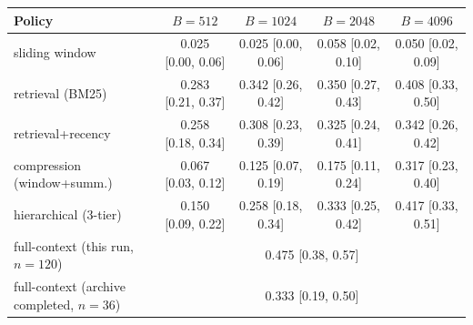 \begin{tabular}{lcccc}
\toprule
Policy & $B{=}512$ & $B{=}1024$ & $B{=}2048$ & $B{=}4096$ \\
\midrule
sliding window & 0.025 [0.00, 0.06] & 0.025 [0.00, 0.06] & 0.058 [0.02, 0.10] & 0.050 [0.02, 0.09] \\
retrieval (BM25) & 0.283 [0.21, 0.37] & 0.342 [0.26, 0.42] & 0.350 [0.27, 0.43] & 0.408 [0.33, 0.50] \\
retrieval+recency & 0.258 [0.18, 0.34] & 0.308 [0.23, 0.39] & 0.325 [0.24, 0.41] & 0.342 [0.26, 0.42] \\
compression (window+summ.) & 0.067 [0.03, 0.12] & 0.125 [0.07, 0.19] & 0.175 [0.11, 0.24] & 0.317 [0.23, 0.40] \\
hierarchical (3-tier) & 0.150 [0.09, 0.22] & 0.258 [0.18, 0.34] & 0.333 [0.25, 0.42] & 0.417 [0.33, 0.51] \\
\midrule
full-context (this run, $n{=}120$) & \multicolumn{4}{c}{0.475 [0.38, 0.57]} \\
full-context (archive completed, $n{=}36$) & \multicolumn{4}{c}{0.333 [0.19, 0.50]} \\
\bottomrule
\end{tabular}
